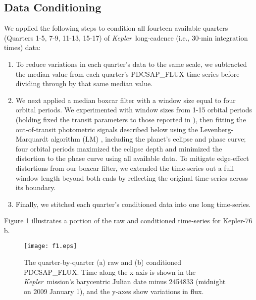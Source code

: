 \documentclass[manuscript]{aastex62}
\newcommand{\kepler}{{\it Kepler}}
\begin{document}
\subsection{Data Conditioning}
We applied the following steps to condition all fourteen available quarters (Quarters 1-5, 7-9, 11-13, 15-17) of \kepler\ long-cadence (i.e., 30-min integration times) data:
\begin{enumerate}
\item To reduce variations in each quarter's data to the same scale, we subtracted the median value from each quarter's PDCSAP\_FLUX time-series before dividing through by that same median value.
\item We next applied a median boxcar filter with a window size equal to four orbital periods. We experimented with window sizes from 1-15 orbital periods (holding fixed the transit parameters to those reported in \citealt{2013ApJ...771...26F}), then fitting the out-of-transit photometric signals described below using the Levenberg-Marquardt algorithm (LM) \citep{newville_2014_11813}, including the planet's eclipse and phase curve; four orbital periods maximized the eclipse depth and minimized the distortion to the phase curve using all available data. To mitigate edge-effect distortions from our boxcar filter, we extended the time-series out a full window length beyond both ends by reflecting the original time-series across its boundary.
\item Finally, we stitched each quarter's conditioned data into one long time-series.
\end{enumerate}
Figure \ref{fig:raw-conditioned-data_Analysis_of_Kepler76b} illustrates a portion of the raw and conditioned time-series for Kepler-76 b. 

\begin{figure}
\texttt{[image: f1.eps]}
\caption{The quarter-by-quarter (a) raw and (b) conditioned PDCSAP\_FLUX. Time along the x-axis is shown in the \kepler\ mission's barycentric Julian date minus 2454833 (midnight on 2009 January 1), and the y-axes show variations in flux.\label{fig:raw-conditioned-data_Analysis_of_Kepler76b}}
\end{figure}
\end{document}
